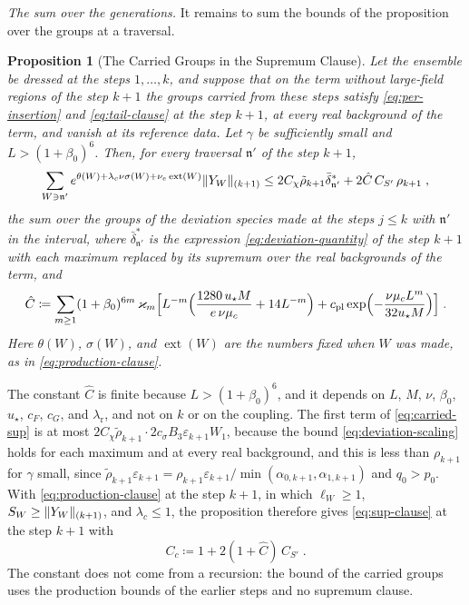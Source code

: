 \documentclass[11pt]{preprint}
\DeclarePairedDelimiter{\norm}{\lVert}{\rVert}
\numberwithin{equation}{section}
\newtheorem{proposition}[theorem]{Proposition}
\theoremstyle{definition}
\theoremstyle{remark}
\theoremstyle{plain}
\begin{document}
\emph{The sum over the generations.} It remains to sum the bounds of the proposition over the groups at a traversal.

\begin{proposition}[The Carried Groups in the Supremum Clause]\label{prop:carried-sup}
Let the ensemble be dressed at the steps $1, \dots, k$, and suppose that on the term without large-field regions of the step $k + 1$ the groups carried from these steps satisfy \eqref{eq:per-insertion} and \eqref{eq:tail-clause} at the step $k + 1$, at every real background of the term, and vanish at its reference data. Let $\gamma$ be sufficiently small and $L > (1 + \beta_0)^6$. Then, for every traversal $\mathfrak n'$ of the step $k + 1$,
\begin{equation}\label{eq:carried-sup}
    \sum_{W \ni \mathfrak n'}e^{\theta(W) + \lambda_c\nu\sigma(W) + \nu_e\operatorname{ext}(W)}\norm{Y_W}_{(k+1)} \leq 2C_\chi\tilde\rho_{k+1}\bar\delta^*_{\mathfrak n'} + 2\hat C\,C_{S'}\,\rho_{k+1}\;,
\end{equation}
the sum over the groups of the deviation species made at the steps $j \leq k$ with $\mathfrak n'$ in the interval, where $\bar\delta^*_{\mathfrak n'}$ is the expression \eqref{eq:deviation-quantity} of the step $k + 1$ with each maximum replaced by its supremum over the real backgrounds of the term, and
\begin{equation}\label{eq:generation-constant}
    \hat C \coloneqq \sum_{m \geq 1}(1 + \beta_0)^{6m}\,\varkappa_m\Bigl[L^{-m}\Bigl(\frac{1280\,u_\star M}{e\,\nu\mu_c} + 14L^{-m}\Bigr) + c_{\mathrm{pl}}\exp\Bigl(-\frac{\nu\mu_cL^m}{32u_\star M}\Bigr)\Bigr]\;.
\end{equation}
Here $\theta(W)$, $\sigma(W)$, and $\operatorname{ext}(W)$ are the numbers fixed when $W$ was made, as in \eqref{eq:production-clause}.
\end{proposition}

The constant $\hat C$ is finite because $L > (1 + \beta_0)^6$, and it depends on $L$, $M$, $\nu$, $\beta_0$, $u_\star$, $c_F$, $c_G$, and $\lambda_{\mathrm r}$, and not on $k$ or on the coupling. The first term of \eqref{eq:carried-sup} is at most $2C_\chi\tilde\rho_{k+1} \cdot 2c_\sigma B_3\varepsilon_{k+1}W_1$, because the bound \eqref{eq:deviation-scaling} holds for each maximum and at every real background, and this is less than $\rho_{k+1}$ for $\gamma$ small, since $\tilde\rho_{k+1}\varepsilon_{k+1} = \rho_{k+1}\varepsilon_{k+1}/\min(\alpha_{0,k+1}, \alpha_{1,k+1})$ and $q_0 > p_0$. With \eqref{eq:production-clause} at the step $k + 1$, in which $\ell_W \geq 1$, $S_W \geq \norm{Y_W}_{(k+1)}$, and $\lambda_c \leq 1$, the proposition therefore gives \eqref{eq:sup-clause} at the step $k + 1$ with
\begin{equation}\label{eq:sup-constant}
    C_c \coloneqq 1 + 2(1 + \hat C)\,C_{S'}\;.
\end{equation}
The constant does not come from a recursion: the bound of the carried groups uses the production bounds of the earlier steps and no supremum clause.
\end{document}

